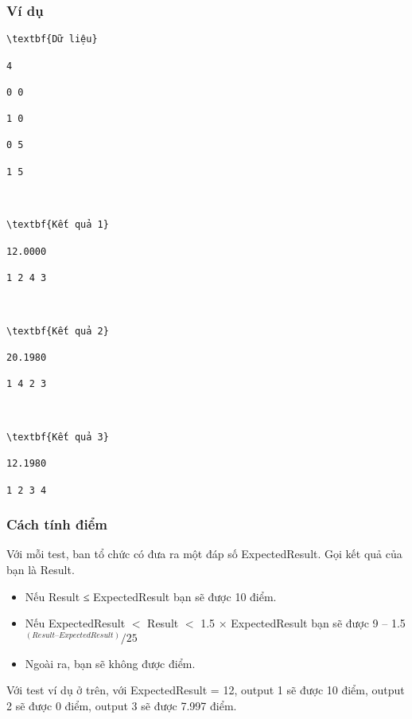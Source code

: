 \subsubsection{Ví dụ}
\begin{verbatim}
\textbf{Dữ liệu}

4

0 0

1 0

0 5

1 5



\textbf{Kết quả 1}

12.0000

1 2 4 3	



\textbf{Kết quả 2}

20.1980

1 4 2 3	



\textbf{Kết quả 3}

12.1980

1 2 3 4

\end{verbatim}

\subsubsection{Cách tính điểm}

Với mỗi test, ban tổ chức có đưa ra một đáp số ExpectedResult. Gọi kết quả của bạn là Result.
\begin{itemize}
	\item Nếu Result ≤ ExpectedResult bạn sẽ được 10 điểm.
	\item Nếu ExpectedResult $<$ Result $<$ 1.5 × ExpectedResult bạn sẽ được 9 – 1.5$^(Result – ExpectedResult) / 25$
	\item Ngoài ra, bạn sẽ không được điểm.
\end{itemize}

Với test ví dụ ở trên, với ExpectedResult = 12, output 1 sẽ được 10 điểm, output 2 sẽ được 0 điểm, output 3 sẽ được 7.997 điểm.